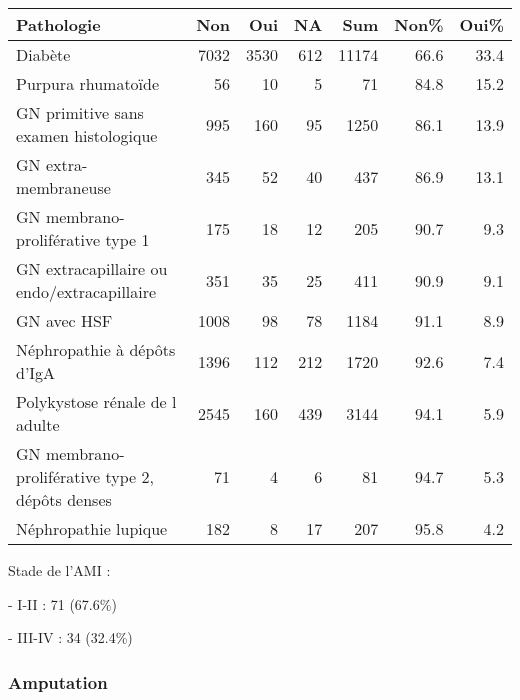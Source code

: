 \documentclass[11pt,a4paper]{article}\usepackage[]{graphicx}\usepackage[]{color}
\begin{document}
\begin{table}[H]
\centering
\begin{tabular}{lrrrrrr}
  \hline
Pathologie & Non & Oui & NA & Sum & Non\% & Oui\% \\ 
  \hline
Diabète & 7032 & 3530 & 612 & 11174 & 66.6 & 33.4 \\ 
  Purpura rhumatoïde & 56 & 10 &  5 & 71 & 84.8 & 15.2 \\ 
  GN primitive sans examen histologique & 995 & 160 & 95 & 1250 & 86.1 & 13.9 \\ 
  GN extra-membraneuse & 345 & 52 & 40 & 437 & 86.9 & 13.1 \\ 
  GN membrano-proliférative type 1 & 175 & 18 & 12 & 205 & 90.7 & 9.3 \\ 
  GN extracapillaire ou endo/extracapillaire & 351 & 35 & 25 & 411 & 90.9 & 9.1 \\ 
  GN avec HSF & 1008 & 98 & 78 & 1184 & 91.1 & 8.9 \\ 
  Néphropathie à dépôts d'IgA & 1396 & 112 & 212 & 1720 & 92.6 & 7.4 \\ 
  Polykystose rénale de l adulte & 2545 & 160 & 439 & 3144 & 94.1 & 5.9 \\ 
  GN membrano-proliférative type 2, dépôts denses & 71 &  4 &  6 & 81 & 94.7 & 5.3 \\ 
  Néphropathie lupique & 182 &  8 & 17 & 207 & 95.8 & 4.2 \\ 
   \hline
\end{tabular}
\end{table}


Stade de l’AMI : 

- I-II : 71 (67.6\%)

- III-IV : 34 (32.4\%)

\subsubsection*{Amputation}
\end{document}
